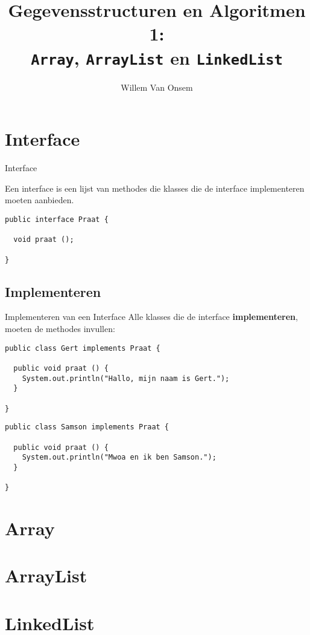 \documentclass[handout]{beamer}
\title{Gegevensstructuren en Algoritmen 1:\\ \texttt{Array}, \texttt{ArrayList} en \texttt{LinkedList}}
\author{Willem Van Onsem}
\newcommand{\term}[1]{\textbf{#1}}
\begin{document}
\begin{frame}[plain]
\maketitle
\end{frame}
\begin{frame}
\tableofcontents
\end{frame}
\section{Interface}
\begin{frame}[fragile]{Interface}
\begin{definition}[Interface]
Een interface is een lijst van methodes die klasses die de interface implementeren moeten aanbieden.
\end{definition}
\begin{example}
\begin{lstlisting}
public interface Praat {

  void praat ();

}
\end{lstlisting}
\end{example}
\end{frame}
\subsection{Implementeren}
\begin{frame}[fragile]{Implementeren van een Interface}
Alle klasses die de interface \term{implementeren}, moeten de methodes invullen:
\begin{example}
\begin{lstlisting}
public class Gert implements Praat {

  public void praat () {
    System.out.println("Hallo, mijn naam is Gert.");
  }

}
\end{lstlisting}
\end{example}
\begin{example}
\small{\begin{lstlisting}
public class Samson implements Praat {

  public void praat () {
    System.out.println("Mwoa en ik ben Samson.");
  }

}
\end{lstlisting}}
\end{example}
\end{frame}
\section{Array}
\section{ArrayList}
\section{LinkedList}
\end{document}
